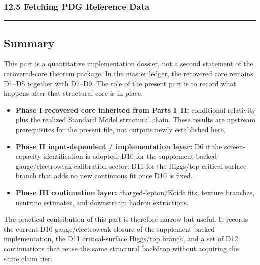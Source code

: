 \subsubsection{12.5 Fetching PDG Reference Data}\label{125-fetching-pdg-reference-data}

\begin{Shaded}
\begin{Highlighting}[]
\end{Highlighting}
\end{Shaded}

\begin{center}\rule{0.5\linewidth}{0.5pt}\end{center}

\subsection{Summary}\label{summary}

This part is a quantitative implementation dossier, not a second statement of the recovered-core theorem package. In the master ledger, the recovered core remains D1--D5 together with D7--D9. The role of the present part is to record what happens after that structural core is in place.

\begin{itemize}
\item \textbf{Phase I recovered core inherited from Parts I--II:} conditional relativity plus the realized Standard Model structural chain. These results are upstream prerequisites for the present file, not outputs newly established here.
\item \textbf{Phase II input-dependent / implementation layer:} D6 if the screen-capacity identification is adopted; D10 for the supplement-backed gauge/electroweak calibration sector; D11 for the Higgs/top critical-surface branch that adds no new continuous fit once D10 is fixed.
\item \textbf{Phase III continuation layer:} charged-lepton/Koide fits, texture branches, neutrino estimates, and downstream hadron extractions.
\end{itemize}

The practical contribution of this part is therefore narrow but useful. It records the current D10 gauge/electroweak closure of the supplement-backed implementation, the D11 critical-surface Higgs/top branch, and a set of D12 continuations that reuse the same structural backdrop without acquiring the same claim tier.

